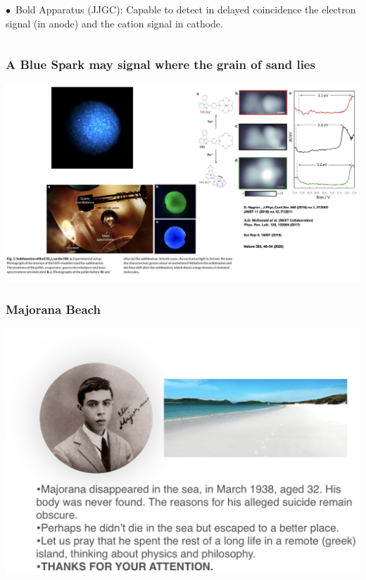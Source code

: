 \begin{frame}
\begin{columns}
$\bullet$~Bold Apparatus (JJGC): Capable to detect in delayed coincidence the electron signal (in anode) and the cation signal in cathode.


\end{columns}
\end{frame}

\begin{frame}
\frametitle{A Blue Spark may signal where the grain of sand lies}
\includegraphics[scale=0.18]{img/BaTaResults.png}

\end{frame}


\begin{frame}
\frametitle{Majorana Beach}
\includegraphics[scale=0.30]{img/MajoranaBeach2.png}
\end{frame}
%
%
